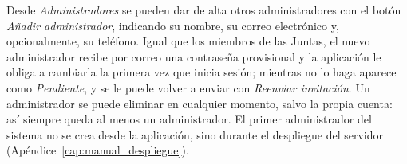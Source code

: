 Desde \emph{Administradores} se pueden dar de alta otros administradores con el botón \emph{Añadir administrador}, indicando su nombre, su correo electrónico y, opcionalmente, su teléfono. Igual que los miembros de las Juntas, el nuevo administrador recibe por correo una contraseña provisional y la aplicación le obliga a cambiarla la primera vez que inicia sesión; mientras no lo haga aparece como \emph{Pendiente}, y se le puede volver a enviar con \emph{Reenviar invitación}. Un administrador se puede eliminar en cualquier momento, salvo la propia cuenta: así siempre queda al menos un administrador. El primer administrador del sistema no se crea desde la aplicación, sino durante el despliegue del servidor (Apéndice~\ref{cap:manual_despliegue}).
